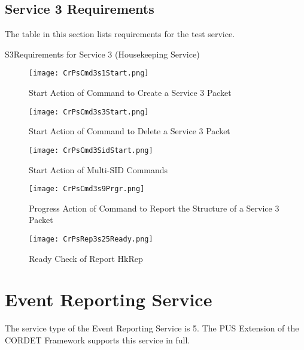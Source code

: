 \documentclass{pnp_article}
\begin{document}
\subsection{Service 3 Requirements}
The table in this section lists requirements for the test service.

\begin{crReq}{S3}{Requirements for Service 3 (Housekeeping Service)}
\end{crReq}

\begin{figure}[H]
 \centering
 \texttt{[image: CrPsCmd3s1Start.png]}
 \caption{Start Action of Command to Create a Service 3 Packet}
 \label{fig:Cmd3s1Start}
\end{figure}

\begin{figure}[H]
 \centering
 \texttt{[image: CrPsCmd3s3Start.png]}
 \caption{Start Action of Command to Delete a Service 3 Packet}
 \label{fig:Cmd3s3Start}
\end{figure}

\begin{figure}[H]
 \centering
 \texttt{[image: CrPsCmd3SidStart.png]}
 \caption{Start Action of Multi-SID Commands}
 \label{fig:Cmd3SidStart}
\end{figure}

\begin{figure}[H]
 \centering
 \texttt{[image: CrPsCmd3s9Prgr.png]}
 \caption{Progress Action of Command to Report the Structure of a Service 3 Packet}
 \label{fig:Cmd3s9Prgr}
\end{figure}

\begin{figure}[H]
 \centering
 \texttt{[image: CrPsRep3s25Ready.png]}
 \caption{Ready Check of Report HkRep}
 \label{fig:Rep3s25Ready}
\end{figure}


\section{Event Reporting Service}\label{sec:serv5}
The service type of the Event Reporting Service is 5. The PUS Extension of the CORDET Framework supports this service in full.
\end{document}
